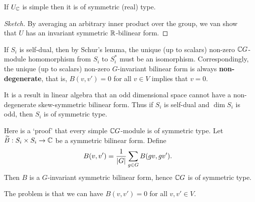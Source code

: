 \begin{prop}
  If $U_{\mathbb{C}}$ is simple then it is of symmetric (real) type.
\end{prop}

\begin{proof}[Sketch]
  By averaging an arbitrary inner product over the group, we van show that $U$ has an invariant symmetric $\mathbb{R}$-bilinear form.
\end{proof}

\begin{rmk}
  \lv
  \begin{enum}
    \io
    If $S_i$ is self-dual, then by Schur's lemma, the unique (up to scalars) non-zero $\mathbb{C} G$-module homomorphism from $S_i$ to $S_i^*$ must be an isomorphism.
    Correspondingly, the unique (up to scalars) non-zero $G$-invariant bilinear form is always \textbf{non-degenerate}, that is, $B(v,v')=0$ for all $v \in V$ implies that $v=0$.

    \io
    It is a result in linear algebra that an odd dimensional space cannot have a non-degenerate skew-symmetric bilinear form.
    Thus if $S_i$ is self-dual and $\dim S_i$ is odd, then $S_i$ is of symmetric type.
  \end{enum}
\end{rmk}

\begin{rmk}
  Here is a `proof' that every simple $\mathbb{C} G$-module is of symmetric type.
  Let $\widetilde B: S_i \times S_i \to \mathbb{C}$ be a symmetric bilinear form.
  Define
  \[ B(v,v') = \frac{1}{\left\lvert G \right\rvert} \sum_{g \in G} B(gv,gv'). \]
  Then $B$ is a $G$-invariant symmetric bilinear form, hence $\mathbb{C} G$ is of symmetric type.

  The problem is that we can have $B(v,v')=0$ for all $v,v' \in V$.
\end{rmk}
